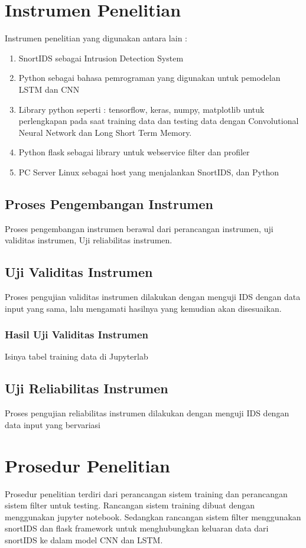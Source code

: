 \documentclass[./skripsi.tex]{subfiles}
\begin{document}
\section{Instrumen Penelitian}
Instrumen penelitian yang digunakan antara lain :
\begin{enumerate}
    \item SnortIDS sebagai Intrusion Detection System
    \item Python sebagai bahasa pemrograman yang digunakan untuk pemodelan LSTM dan CNN
    \item Library python seperti : tensorflow, keras, numpy, matplotlib untuk perlengkapan pada saat training data dan testing data dengan Convolutional Neural Network dan Long Short Term Memory.
    \item Python flask sebagai library untuk webservice filter dan profiler
    \item PC Server Linux sebagai host yang menjalankan SnortIDS, dan Python
\end{enumerate}
\subsection{Proses Pengembangan Instrumen}
\par Proses pengembangan instrumen berawal dari perancangan instrumen, uji validitas instrumen, Uji reliabilitas instrumen.
\subsection{Uji Validitas Instrumen}
\par Proses pengujian validitas instrumen dilakukan dengan menguji IDS dengan data input yang sama, lalu mengamati hasilnya yang kemudian akan disesuaikan.
\subsubsection{Hasil Uji Validitas Instrumen}
\par Isinya tabel training data di Jupyterlab
\subsection{Uji Reliabilitas Instrumen}
\par Proses pengujian reliabilitas instrumen dilakukan dengan menguji IDS dengan data input yang bervariasi
\section{Prosedur Penelitian}
\par Prosedur penelitian terdiri dari perancangan sistem training dan perancangan sistem filter untuk testing. Rancangan sistem training dibuat dengan menggunakan jupyter notebook. Sedangkan rancangan sistem filter menggunakan snortIDS dan flask framework untuk menghubungkan keluaran data dari snortIDS ke dalam model CNN dan LSTM.
\end{document}
